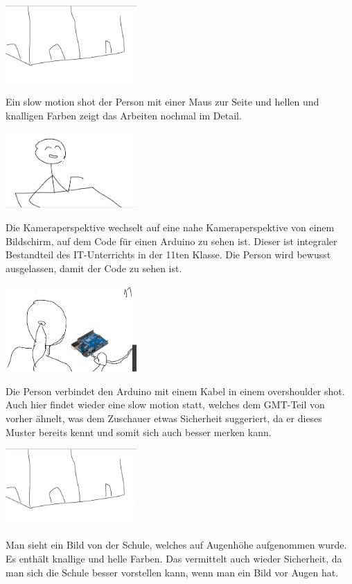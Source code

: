 \documentclass[8pt, letterpaper]{article}
\begin{document}
\includegraphics[width=5cm]{scene_9}

Ein slow motion shot der Person mit einer Maus zur Seite und hellen und knalligen Farben zeigt das Arbeiten nochmal im Detail.

\includegraphics[width=5cm]{scene_10}

Die Kameraperspektive wechselt auf eine nahe Kameraperspektive von einem Bildschirm, auf dem Code für einen Arduino zu sehen ist. Dieser ist integraler Bestandteil des IT-Unterrichts in der 11ten Klasse. Die Person wird bewusst ausgelassen, damit der Code zu sehen ist.

\includegraphics[width=5cm]{scene_11}

Die Person verbindet den Arduino mit einem Kabel in einem overshoulder shot. Auch hier findet wieder eine slow motion statt, welches dem GMT-Teil von vorher ähnelt, was dem Zuschauer etwas Sicherheit suggeriert, da er dieses Muster bereits kennt und somit sich auch besser merken kann.

\includegraphics[width=5cm]{scene_12}

Man sieht ein Bild von der Schule, welches auf Augenhöhe aufgenommen wurde. Es enthält knallige und helle Farben. Das vermittelt auch wieder Sicherheit, da man sich die Schule besser vorstellen kann, wenn man ein Bild vor Augen hat.
\end{document}
